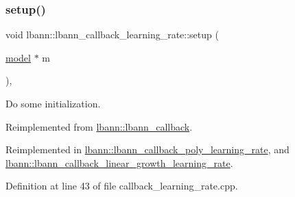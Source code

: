 \subsubsection{\texorpdfstring{setup()}{setup()}}
{\footnotesize\ttfamily void lbann\+::lbann\+\_\+callback\+\_\+learning\+\_\+rate\+::setup (\begin{DoxyParamCaption}\item[{\hyperlink{classlbann_1_1model}{model} $\ast$}]{m }\end{DoxyParamCaption})\hspace{0.3cm}{\ttfamily [override]}, {\ttfamily [virtual]}}

Do some initialization. 

Reimplemented from \hyperlink{classlbann_1_1lbann__callback_aab5086e27d9bb0a7c7ee8ffc1bc58671}{lbann\+::lbann\+\_\+callback}.



Reimplemented in \hyperlink{classlbann_1_1lbann__callback__poly__learning__rate_a47d3d2a94157f1992bf4a964620208f3}{lbann\+::lbann\+\_\+callback\+\_\+poly\+\_\+learning\+\_\+rate}, and \hyperlink{classlbann_1_1lbann__callback__linear__growth__learning__rate_afaa81836e0dc1b6220212dad52df25fc}{lbann\+::lbann\+\_\+callback\+\_\+linear\+\_\+growth\+\_\+learning\+\_\+rate}.



Definition at line 43 of file callback\+\_\+learning\+\_\+rate.\+cpp.


